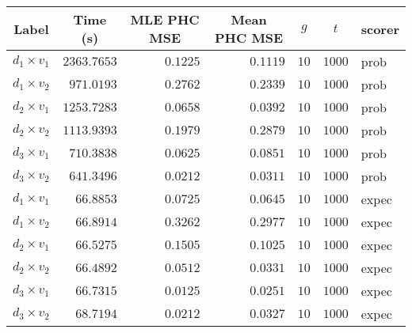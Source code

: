 \begin{tabular}{lrrrrrl}
  \toprule
  \multicolumn{1}{c}{Label} & \multicolumn{1}{c}{Time (s)} & \multicolumn{1}{c}{MLE PHC MSE} & \multicolumn{1}{c}{Mean PHC MSE} & \multicolumn{1}{c}{$g$} & \multicolumn{1}{c}{$t$} & \multicolumn{1}{c}{scorer} \\
  \midrule
   $d_1 \times v_1$ &              $2363.7653$ &                        $0.1225$ &                         $0.1119$ &                    $10$ &                  $1000$ &                       prob \\
   $d_1 \times v_2$ &               $971.0193$ &                        $0.2762$ &                         $0.2339$ &                    $10$ &                  $1000$ &                       prob \\
   $d_2 \times v_1$ &              $1253.7283$ &                        $0.0658$ &                         $0.0392$ &                    $10$ &                  $1000$ &                       prob \\
   $d_2 \times v_2$ &              $1113.9393$ &                        $0.1979$ &                         $0.2879$ &                    $10$ &                  $1000$ &                       prob \\
   $d_3 \times v_1$ &               $710.3838$ &                        $0.0625$ &                         $0.0851$ &                    $10$ &                  $1000$ &                       prob \\
   $d_3 \times v_2$ &               $641.3496$ &                        $0.0212$ &                         $0.0311$ &                    $10$ &                  $1000$ &                       prob \\
   \midrule
   $d_1 \times v_1$ &                $66.8853$ &                        $0.0725$ &                         $0.0645$ &                    $10$ &                  $1000$ &                      expec \\
   $d_1 \times v_2$ &                $66.8914$ &                        $0.3262$ &                         $0.2977$ &                    $10$ &                  $1000$ &                      expec \\
   $d_2 \times v_1$ &                $66.5275$ &                        $0.1505$ &                         $0.1025$ &                    $10$ &                  $1000$ &                      expec \\
   $d_2 \times v_2$ &                $66.4892$ &                        $0.0512$ &                         $0.0331$ &                    $10$ &                  $1000$ &                      expec \\
   $d_3 \times v_1$ &                $66.7315$ &                        $0.0125$ &                         $0.0251$ &                    $10$ &                  $1000$ &                      expec \\
   $d_3 \times v_2$ &                $68.7194$ &                        $0.0212$ &                         $0.0327$ &                    $10$ &                  $1000$ &                      expec \\
  \bottomrule
\end{tabular}

